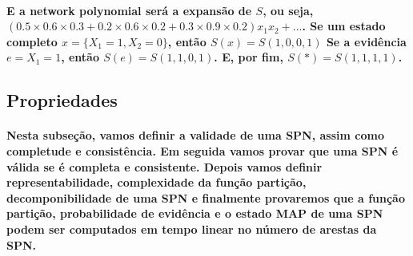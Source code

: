 \documentclass[a4paper,10pt]{article}
\theoremstyle{plain}
\begin{document}
\paragraph{
  E a network polynomial será a expansão de $S$, ou seja, $(0.5 \times 0.6 \times 0.3 + 0.2 \times
  0.6 \times 0.2 + 0.3 \times 0.9 \times 0.2)x_1x_2 + ...$. Se um estado completo $x = \{X_1 = 1,
  X_2 = 0\}$, então $S(x) = S(1, 0, 0, 1)$ Se a evidência $e={X_1=1}$, então $S(e)=S(1,1,0,1)$.
  E, por fim, $S(*) = S(1, 1, 1, 1)$.
}

\subsection{Propriedades}

\paragraph{
  Nesta subseção, vamos definir a validade de uma SPN, assim como completude e consistência. Em
  seguida vamos provar que uma SPN é válida se é completa e consistente. Depois vamos definir
  representabilidade, complexidade da função partição, decomponibilidade de uma SPN e finalmente
  provaremos que a função partição, probabilidade de evidência e o estado MAP\cite{report-1} de uma
  SPN podem ser computados em tempo linear no número de arestas da SPN.
}

\newpage

\printbibliography
\end{document}
